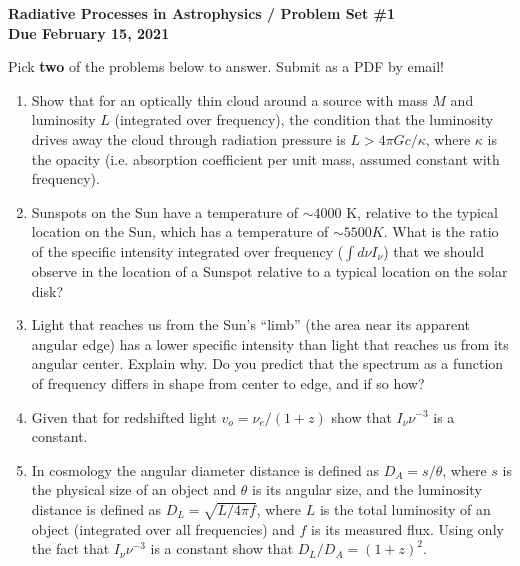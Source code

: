 \documentclass[11pt, preprint]{article}
\begin{document}
\begin{center}
  {\bf Radiative Processes in Astrophysics / Problem Set \#1 \\
    Due February 15, 2021}
\end{center}

\noindent Pick {\bf two} of the problems below to answer. Submit
as a PDF by email!

\begin{enumerate}
\item Show that for an optically thin cloud around a source with mass
  $M$ and luminosity $L$ (integrated over frequency), the condition
  that the luminosity drives away the cloud through radiation pressure
  is $L>4\pi G c/\kappa$, where $\kappa$ is the opacity
  (i.e. absorption coefficient per unit mass, assumed constant with
  frequency). 
\item Sunspots on the Sun have a temperature of $\sim 4000$ K,
  relative to the typical location on the Sun, which has a temperature
  of $\sim 5500 K$. What is the ratio of the specific intensity
  integrated over frequency ($\int d\nu I_\nu$) that we should observe
  in the location of a Sunspot relative to a typical location on the
  solar disk?
\item Light that reaches us from the Sun's ``limb'' (the area near its
  apparent angular edge) has a lower specific intensity than light
  that reaches us from its angular center. Explain why. Do you predict
  that the spectrum as a function of frequency differs in shape from
  center to edge, and if so how?
\item Given that for redshifted light $v_o = \nu_e / (1+z)$ show that
  $I_\nu \nu^{-3}$ is a constant. 
\item In cosmology the angular diameter distance is defined as $D_A =
  s / \theta$, where $s$ is the physical size of an object and
  $\theta$ is its angular size, and the luminosity distance is defined
  as $D_L = \sqrt{L/4\pi f}$, where $L$ is the total luminosity of an
  object (integrated over all frequencies) and $f$ is its measured
  flux. Using only the fact that $I_\nu \nu^{-3}$ is a constant show
  that $D_L/D_A = (1+z)^2$.
\end{enumerate}
\end{document}
